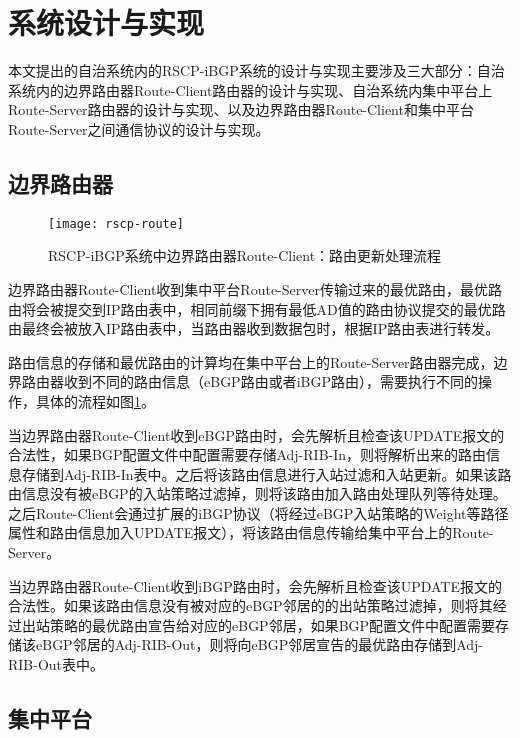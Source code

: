 \section{系统设计与实现}


本文提出的自治系统内的RSCP-iBGP系统的设计与实现主要涉及三大部分：自治系统内的边界路由器Route-Client路由器的设计与实现、自治系统内集中平台上Route-Server路由器的设计与实现、以及边界路由器Route-Client和集中平台Route-Server之间通信协议的设计与实现。


\subsection{边界路由器}

\begin{figure}
  \centering
  \texttt{[image: rscp-route]}
  \caption{RSCP-iBGP系统中边界路由器Route-Client：路由更新处理流程}
  \label{fig:rscp-route}
\end{figure}



边界路由器Route-Client收到集中平台Route-Server传输过来的最优路由，最优路由将会被提交到IP路由表中，相同前缀下拥有最低AD值的路由协议提交的最优路由最终会被放入IP路由表中，当路由器收到数据包时，根据IP路由表进行转发\cite{DianeTeare2016CCNP}。

路由信息的存储和最优路由的计算均在集中平台上的Route-Server路由器完成，边界路由器收到不同的路由信息（eBGP路由或者iBGP路由），需要执行不同的操作，具体的流程如图\ref{fig:rscp-route}。

当边界路由器Route-Client收到eBGP路由时，会先解析且检查该UPDATE报文的合法性，如果BGP配置文件中配置需要存储Adj-RIB-In，则将解析出来的路由信息存储到Adj-RIB-In表中。之后将该路由信息进行入站过滤和入站更新。如果该路由信息没有被eBGP的入站策略过滤掉，则将该路由加入路由处理队列等待处理。之后Route-Client会通过扩展的iBGP协议（将经过eBGP入站策略的Weight等路径属性和路由信息加入UPDATE报文），将该路由信息传输给集中平台上的Route-Server。

当边界路由器Route-Client收到iBGP路由时，会先解析且检查该UPDATE报文的合法性。如果该路由信息没有被对应的eBGP邻居的的出站策略过滤掉，则将其经过出站策略的最优路由宣告给对应的eBGP邻居，如果BGP配置文件中配置需要存储该eBGP邻居的Adj-RIB-Out，则将向eBGP邻居宣告的最优路由存储到Adj-RIB-Out表中。



\subsection{集中平台}

